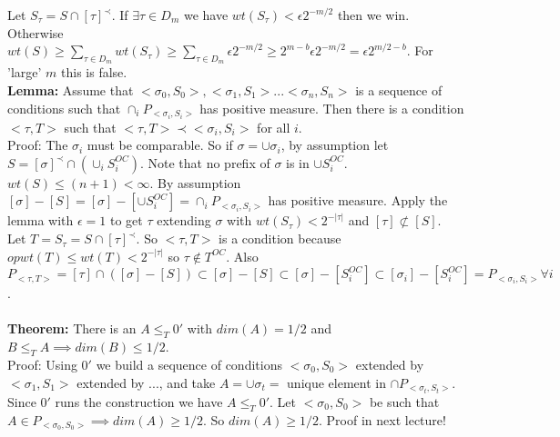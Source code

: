 \documentclass{article}
\begin{document}
   Let $S_\tau = S \cap [\tau]^\prec$. If $\exists \tau \in D_m$ we have $wt(S_\tau) < \epsilon 2^{-m/2}$ then we win. Otherwise $wt(S) \geq \sum_{\tau \in D_m} wt(S_\tau) \geq \sum_{\tau \in D_m } \epsilon 2^{-m/2}\geq 2^{m-b} \epsilon 2^{-m/2} = \epsilon 2^{m/2 - b}$.  For 'large' $m$ this is false. \\
   \textbf{Lemma:} Assume that $<\sigma_0, S_0> , <\sigma_1,S_1> ... <\sigma_n, S_n>$ is a sequence of conditions such that $\cap_i P_{<\sigma_i,S_i>}$ has positive measure. Then there is a condition $<\tau , T>$ such that $<\tau, T > \prec <\sigma_i,S_i>$ for all $i$. \\
   Proof: The $\sigma_i$ must be comparable. So if $\sigma = \cup \sigma_i$, by assumption let $S= [\sigma]^\prec \cap (\cup_i S_i^{OC})$. Note that no prefix of $\sigma$ is in $\cup S_i^{OC}$.\\
   $wt(S) \leq (n+1)< \infty$. By assumption $[\sigma] - [S] = [\sigma] - [\cup S_i^{OC}] =\cap_i P_{<\sigma_i,S_i>} $ has positive measure. Apply the lemma with $\epsilon = 1$ to get $\tau $ extending $\sigma$ with $wt(S_\tau) < 2^{-|\tau|}$ and $[\tau] \not \subset [S]$.\\
   Let $T = S_\tau = S \cap [\tau]^\prec$. So $<\tau,T> $ is a condition because $opwt(T) \leq wt(T) < 2^{-|\tau|}$ so $\tau \not \in T^{OC}$. Also $P_{<\tau,T>} = [\tau] \cap ([\sigma] - [S]) \subset [\sigma] - [S] \subset [\sigma] - [S_i^{OC}] \subset [\sigma_i]- [S_i^{OC}] = P_{<\sigma_i,S_i>} \forall i$.
   \\\\
   \textbf{Theorem:} There is an $A \leq_T0'$ with $dim(A) = 1/2$ and $B \leq_TA \implies dim(B) \leq 1/2$.\\
   Proof: Using $0'$ we build a sequence of conditions $<\sigma_0, S_0> $ extended by $<\sigma_1,S_1> $ extended by ..., and take $A = \cup \sigma_t = $ unique element in $\cap P_{<\sigma_t,S_t>}$. Since $0'$ runs the construction we have $A \leq_T 0'$. Let $<\sigma_0, S_0> $ be such that $A \in P_{<\sigma_0,S_0>}\implies dim(A) \geq 1/2$. So $dim(A) \geq 1/2$. Proof in next lecture! 
   
   \newpage
\end{document}

